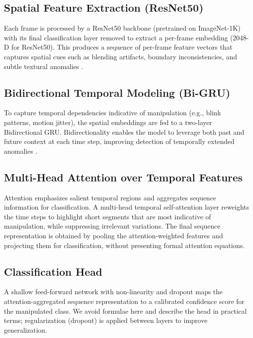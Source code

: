 \subsection{Spatial Feature Extraction (ResNet50)}
Each frame is processed by a ResNet50 backbone (pretrained on ImageNet-1K) with its final classification layer removed to extract a per-frame embedding (2048-D for ResNet50). This produces a sequence of per-frame feature vectors that captures spatial cues such as blending artifacts, boundary inconsistencies, and subtle textural anomalies \cite{rossler2019faceforensics,afchar2018mesonet}.

\subsection{Bidirectional Temporal Modeling (Bi-GRU)}
To capture temporal dependencies indicative of manipulation (e.g., blink patterns, motion jitter), the spatial embeddings are fed to a two-layer Bidirectional GRU. Bidirectionality enables the model to leverage both past and future context at each time step, improving detection of temporally extended anomalies \cite{guera2018deepfake,dey2017gru}.

\subsection{Multi-Head Attention over Temporal Features}
Attention emphasizes salient temporal regions and aggregates sequence information for classification. A multi-head temporal self-attention layer reweights the time steps to highlight short segments that are most indicative of manipulation, while suppressing irrelevant variations. The final sequence representation is obtained by pooling the attention-weighted features and projecting them for classification, without presenting formal attention equations.

\subsection{Classification Head}
A shallow feed-forward network with non-linearity and dropout maps the attention-aggregated sequence representation to a calibrated confidence score for the manipulated class. We avoid formulae here and describe the head in practical terms; regularization (dropout) is applied between layers to improve generalization.

